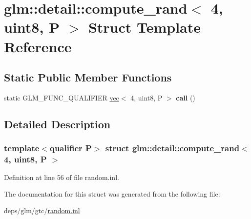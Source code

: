 \hypertarget{structglm_1_1detail_1_1compute__rand_3_014_00_01uint8_00_01P_01_4}{}\section{glm\+:\+:detail\+:\+:compute\+\_\+rand$<$ 4, uint8, P $>$ Struct Template Reference}
\label{structglm_1_1detail_1_1compute__rand_3_014_00_01uint8_00_01P_01_4}
\subsection*{Static Public Member Functions}
\begin{DoxyCompactItemize}
\item 
\mbox{\label{structglm_1_1detail_1_1compute__rand_3_014_00_01uint8_00_01P_01_4_ad77b64fbdc24b387174b436980e33a8c}} 
static G\+L\+M\+\_\+\+F\+U\+N\+C\+\_\+\+Q\+U\+A\+L\+I\+F\+I\+ER \hyperlink{structglm_1_1vec}{vec}$<$ 4, uint8, P $>$ {\bfseries call} ()
\end{DoxyCompactItemize}


\subsection{Detailed Description}
\subsubsection*{template$<$qualifier P$>$\newline
struct glm\+::detail\+::compute\+\_\+rand$<$ 4, uint8, P $>$}



Definition at line 56 of file random.\+inl.



The documentation for this struct was generated from the following file\+:\begin{DoxyCompactItemize}
\item 
deps/glm/gtc/\hyperlink{random_8inl}{random.\+inl}\end{DoxyCompactItemize}
